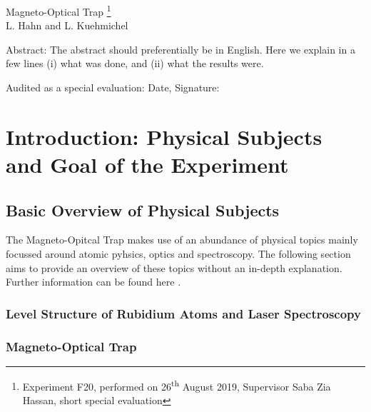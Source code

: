 \documentclass[12pt, a4paper]{article}
\begin{document}
\thispagestyle{empty}     %
\null\vspace{40mm}
\begin{center}
{%
\Large  Magneto-Optical Trap
\footnote{\noindent Experiment F20, performed on 26\textsuperscript{th} August 2019,
Supervisor Saba Zia Hassan,
short special evaluation}
}\\[15mm]
L. Hahn and L. Kuehmichel

\vspace{25mm}

\parbox{0.9\textwidth}{
Abstract:    
\small The abstract should preferentially be in English. Here we explain in a
few lines (i) what was done, and (ii) what the results were.
}
\end{center}

\vfill
Audited as a special evaluation: Date, Signature:
\vspace{20mm}

\null\thispagestyle{empty} 
   

\newpage

\section{Introduction: Physical Subjects and Goal of the Experiment}
\subsection{Basic Overview of Physical Subjects}
The Magneto-Opitcal Trap makes use of an abundance of physical topics mainly focussed around atomic pyhsics, optics and spectroscopy. The following section aims to provide an overview of these topics without an in-depth explanation. Further information can be found here \cite{script}.
\subsubsection{Level Structure of Rubidium Atoms and Laser Spectroscopy}








\subsubsection{Magneto-Optical Trap}
\end{document}
